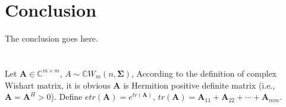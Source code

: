 \documentclass[12pt, draftclsnofoot, onecolumn]{IEEEtran}
\begin{document}
\section{Conclusion}
The conclusion goes here.
\newpage





%


\appendices
\section{}\label{log expectation of OM}
Let $\mathbf{A}\in \mathbb{C}^{m\times m}$, $A\sim \mathbb{C}W_{m}(n, \mathbf{\Sigma})$, According to the definition of complex Wishart matrix, it is obvious $\mathbf{A}$ is Hermition positive definite matrix (i.e., $\mathbf{A}=\mathbf{A}^{H}>0$). Define $etr(\mathbf{A})=e^{tr(\mathbf{A})}$, $tr(\mathbf{A})=\mathbf{A}_{11}+\mathbf{A}_{22}+\cdots+\mathbf{A}_{mm}$.
\end{document}
